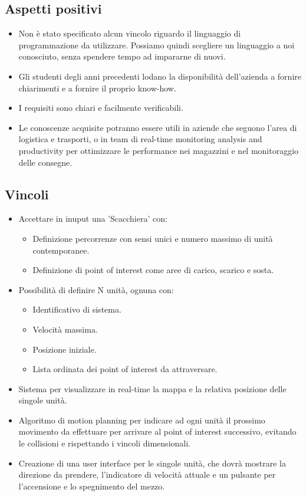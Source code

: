 \subsection{Aspetti positivi}
\begin{itemize}
\item Non è stato specificato alcun vincolo riguardo il linguaggio di programmazione da utilizzare. Possiamo quindi scegliere un linguaggio a noi conosciuto, senza spendere tempo ad impararne di nuovi.
\item Gli studenti degli anni precedenti lodano la disponibilità dell'azienda a fornire chiarimenti e a fornire il proprio know-how.
\item I requisiti sono chiari e facilmente verificabili.
\item Le conoscenze acquisite potranno essere utili in aziende che seguono l'area di logistica e trasporti, o in team di real-time monitoring analysis and productivity per ottimizzare le performance nei magazzini e nel monitoraggio delle consegne.
\end{itemize}

\subsection{Vincoli}
\begin{itemize}
\item Accettare in inuput una 'Scacchiera' con:
\begin{itemize}
	\item Definizione percorrenze con sensi unici e numero massimo di unità contemporanee.
	\item Definizione di point of interest come aree di carico, scarico e sosta.
\end{itemize}
\item Possibilità di definire N unità, ognuna con:
\begin{itemize}
	\item Identificativo di sistema.
	\item Velocità massima.
	\item Posizione iniziale.
	\item Lista ordinata dei point of interest da attraversare.
\end{itemize}
\item Sistema per visualizzare in real-time la mappa e la relativa posizione delle singole unità.
\item Algoritmo di motion planning per indicare ad ogni unità il prossimo movimento da effettuare per arrivare al point of interest successivo, evitando le collisioni e rispettando i vincoli dimensionali.
\item Creazione di una user interface per le singole unità, che dovrà mostrare la direzione da prendere, l'indicatore di velocità attuale e un pulsante per l'accensione e lo spegnimento del mezzo.
\end{itemize}

